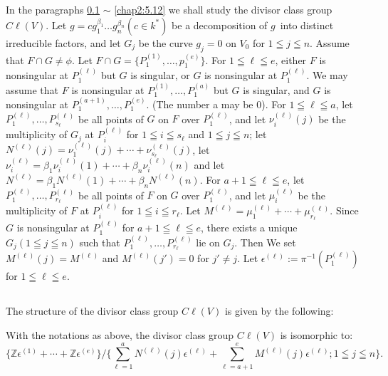 \subsection{}\label{chap2:5.10}
In the paragraphs \ref{chap2:5.10} $\sim$ \ref{chap2:5.12} we shall study the
divisor class group $C\ell(V)$. Let $g=cg^{\beta_{1}}_{1}\ldots
g^{\beta_{n}}_{n}(c\in k^{\ast})$ be a decomposition of
$g$\pageoriginale\ into distinct irreducible factors, and let $G_{j}$
be the curve $g_{j}=0$ on $V_{0}$ for $1\leqq j\leqq n$. Assume that
$F\cap G\neq \phi$. Let $F\cap G=\{P_{1}^{(1)},\ldots,p_{1}^{(e)}\}$. For
$1\leqq \ell \leqq e$, either $F$ is nonsingular at $P^{(\ell)}_{1}$
but $G$ is singular, or $G$ is nonsingular at $P_{1}^{(\ell)}$. We may
assume that $F$ is nonsingular at $P^{(1)}_{1},\ldots,P_{1}^{(a)}$ but
$G$ is singular, and $G$ is nonsingular at
$P_{1}^{(a+1)},\ldots,P_{1}^{(e)}$. (The number a may be $0$). For
$1\leqq \ell\leqq a$, let
$P_{1}^{(\ell)},\ldots,P^{(\ell)}_{s_{\ell}}$ be all points of $G$ on
$F$ over $P^{(\ell)}_{1}$, and let $\nu^{(\ell)}_{i}(j)$ be the
multiplicity of $G_{j}$ at $P^{(\ell)}_{i}$ for $1\leqq i\leqq
s_{\ell}$ and $1\leqq j\leqq n$; let
$N^{(\ell)}(j)=\nu^{(\ell)}_{1}(j)+\cdots+\nu^{(\ell)}_{s_{\ell}}(j)$,
let
$\nu^{(\ell)}_{i}=\beta_{1}\nu_{i}^{(\ell)}(1)+\cdots+\beta_{n}\nu_{i}^{(\ell)}(n)$
and let
$N^{(\ell)}=\beta_{1}N^{(\ell)}(1)+\cdots+\beta_{n}N^{(\ell)}(n)$. For
  $a+1\leqq \ell\leqq e$, let
  $P_{1}^{(\ell)},\ldots,P^{(\ell)}_{r_{\ell}}$ be all points of $F$
  on $G$ over $P^{(\ell)}_{1}$, and let $\mu^{(\ell)}_{i}$ be the
  multiplicity of $F$ at $P^{(\ell)}_{i}$ for $1\leqq i\leqq
  r_{\ell}$. Let
  $M^{(\ell)}=\mu^{(\ell)}_{1}+\cdots+\mu^{(\ell)}_{r_{\ell}}$. Since
  $G$ is nonsingular at $P^{(\ell)}_{1}$ for $a+1\leqq \ell\leqq e$,
  there exists a unique $G_{j}(1\leqq j\leqq n)$ such that
  $P^{(\ell)}_{1},\ldots,P^{(\ell)}_{r_{\ell}}$ lie on $G_{j}$. Then
  We set $M^{(\ell)}(j)=M^{(\ell)}$ and $M^{(\ell)}(j')=0$ for $j'\neq
  j$. Let $\epsilon^{(\ell)}:=\pi^{-1}(P^{(\ell)}_{1})$ for $1\leqq
  \ell \leqq e$.

\subsection{}\label{chap2:5.11}

The structure of the divisor class group $C\ell(V)$ is given by the
following:

\begin{theorem*}
With the notations as above, the divisor class group $C\ell(V)$ is
isomorphic to:
$$
\{\mathbb{Z}\epsilon^{(1)}+\cdots+\mathbb{Z}\epsilon^{(e)}\}/\{\sum^{a}_{\ell=1}N^{(\ell)}(j)\epsilon^{(\ell)}+\sum^{e}_{\ell=a+1}M^{(\ell)}(j)\epsilon^{(\ell)};1\leqq
j\leqq n\}.
$$
\end{theorem*}

